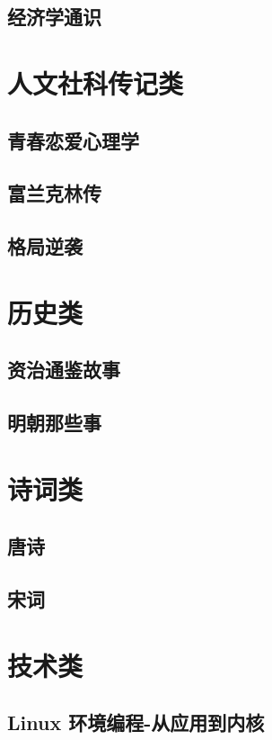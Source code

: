 \documentclass[UTF8,a4paper,12pt]{ctexbook}
\begin{document}
	\section{经济学通识}
	
	
\chapter{人文社科传记类}
	\section{青春恋爱心理学}		
	
	\section{富兰克林传}

	\section{格局逆袭}
	
	
\chapter{历史类}
	\section{资治通鉴故事}
	
	\section{明朝那些事}

\chapter{诗词类}
	\section{唐诗}

	\section{宋词}


\chapter{技术类} 
	\section{Linux 环境编程-从应用到内核}
	
\end{document}
